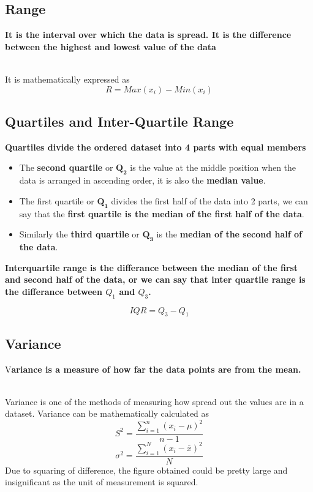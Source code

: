 \documentclass[twoside,12pt]{report}  %
\begin{document}
\subsection{Range}
\begin{tcolorbox}[colback=red!5!white,colframe=red!75!black, title= \textbf{Range}]
	\textbf{It is the interval over which the data is spread. It is the difference between the highest and lowest value of the data} 
\end{tcolorbox}
\noindent
\\
It is mathematically expressed as
$$ R = Max(x_{i}) - Min(x_{i})$$
\subsection{Quartiles and Inter-Quartile Range}
\begin{tcolorbox}[colback=red!5!white, colframe=red!75!black, title=\textbf{Quartiles}]
	\textbf{Quartiles divide the ordered dataset into 4 parts with equal members}
\end{tcolorbox}
\begin{itemize}
	\item The \textbf{second quartile} or $\boldsymbol{Q_2}$ is the value at the middle position when the data is arranged in ascending order, it is also the \textbf{median value}.
	\item The first quartile or $\boldsymbol{Q_1}$ divides the first half of the data into 2 parts, we can say that the \textbf{first quartile is the median of the first half of the data}.
	\item Similarly the \textbf{third quartile} or $\boldsymbol{Q_3}$ is the \textbf{median of the second half of the data}.
\end{itemize}
\begin{tcolorbox}[colback=red!5!white,colframe=red!75!black, title= \textbf{Interquartile Range}]
	\textbf{Interquartile range is the differance between the median of the first and second half of the data, or we can say that inter quartile range is the differance between $Q_1$ and $Q_3$.}
\end{tcolorbox}
$$ IQR = Q_3 - Q_1 $$
\subsection{Variance}
\begin{tcolorbox}[colback=red!5!white,colframe=red!75!black, title= \textbf{Variance}]
	V\textbf{ariance is a measure of how far the data points are from the mean.}
\end{tcolorbox}
\noindent
\\
Variance is one of the methods of measuring how spread out the values are in a dataset. Variance can be mathematically calculated as
$$ S^2 = \frac{\sum_{i=1}^{n} (x_i - \mu)^2 }{n-1} $$
$$ \sigma^2 = \frac{\sum_{i=1}^{N} (x_i - \bar{x})^2 }{N} $$
Due to squaring of difference, the figure obtained could be pretty large and insignificant as the unit of measurement is squared.
\end{document}
